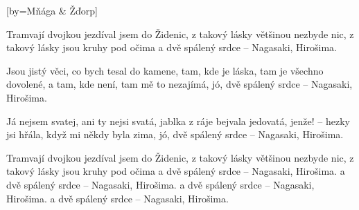 [by={Mňága \& Žďorp}]

\beginchorus{}
Tramvají dvojkou jezdíval jsem do Židenic,   
z takový lásky většinou nezbyde nic,
z takový lásky jsou kruhy pod očima
a dvě spálený srdce -- Nagasaki, Hirošima.   
\endchorus{}

\beginverse{}
Jsou jistý věci, co bych tesal do kamene,   
tam, kde je láska, tam je všechno dovolené,
a tam, kde není, tam mě to nezajímá,
jó, dvě spálený srdce -- Nagasaki, Hirošima.   
\endverse{}

\beginverse{}
\chordsoff{}
Já nejsem svatej, ani ty nejsi svatá,   
jablka z ráje bejvala jedovatá,
jenže! -- hezky jsi hřála, když mi někdy byla zima,
jó, dvě spálený srdce -- Nagasaki, Hirošima.   
\chordson{}
\endverse{}

\beginchorus{}
\chordsoff{}
Tramvají dvojkou jezdíval jsem do Židenic,   
z takový lásky většinou nezbyde nic,
z takový lásky jsou kruhy pod očima
a dvě spálený srdce -- Nagasaki, Hirošima.   
a dvě spálený srdce -- Nagasaki, Hirošima.   
a dvě spálený srdce -- Nagasaki, Hirošima.   
a dvě spálený srdce -- Nagasaki, Hirošima.   
\chordson{}
\endchorus{}

\endsong{}
